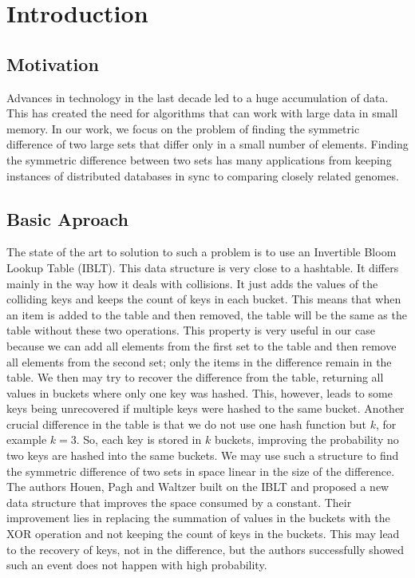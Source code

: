 \chapter*{Introduction}

\section*{Motivation}

Advances in technology in the last decade led to a huge accumulation of data. 
This has created the need for algorithms that can work with large data in small memory. 
In our work, we focus on the problem of finding the symmetric difference of two large sets 
that differ only in a small number of elements. 
Finding the symmetric difference between two sets has many applications 
from keeping instances of distributed databases in sync to comparing closely related genomes.

\section*{Basic Aproach}
The state of the art to solution to such a problem is 
to use an Invertible Bloom Lookup Table (IBLT). This data structure is very close to a hashtable.
It differs mainly in the way how it deals with collisions. It just adds the values of the colliding keys and keeps the count of keys in each bucket.
This means that when an item is added to the table and then removed, the table will be the same as the table without these two operations.
This property is very useful in our case because we can add all elements from the first set to the table and then remove all elements from the second set; only the items in the difference remain in the table. We then may try to recover the difference from the table, returning all values in buckets where only one key was hashed. This, however, leads to some keys being unrecovered if multiple keys were hashed to the same bucket.
Another crucial difference in the table is that we do not use one hash function but $k$, for example $k=3$. So, each key is stored in $k$ buckets, 
improving the probability no two keys are hashed into the same buckets.
We may use such a structure to find the symmetric difference of two sets in space linear in the size of the difference.
The authors Houen, Pagh and Waltzer built on the IBLT and proposed a new data structure that improves the space consumed by a constant. \cite{doi:10.1137/1.9781611977585.ch21} 
Their improvement lies in replacing the summation of values in the buckets with the XOR operation and not keeping the count of keys in the buckets.
This may lead to the recovery of keys, not in the difference, but the authors successfully showed such an event does not happen with high probability.


